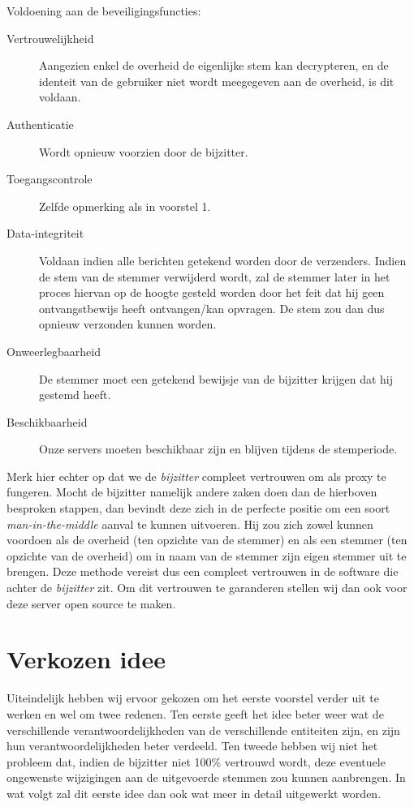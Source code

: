 \documentclass[a4paper,12pt]{article}
\begin{document}
Voldoening aan de beveiligingsfuncties:

\begin{description}
    \item[Vertrouwelijkheid] Aangezien enkel de overheid de eigenlijke stem kan
    decrypteren, en de identeit van de gebruiker niet wordt meegegeven aan de
    overheid, is dit voldaan.
    \item[Authenticatie] Wordt opnieuw voorzien door de bijzitter.
    \item[Toegangscontrole] Zelfde opmerking als in voorstel 1.
    \item[Data-integriteit] Voldaan indien alle berichten getekend worden door
      de verzenders. Indien de stem van de stemmer verwijderd wordt, zal de
      stemmer later in het proces hiervan op de hoogte gesteld worden door het
      feit dat hij geen ontvangstbewijs heeft ontvangen/kan opvragen. De stem
      zou dan dus opnieuw verzonden kunnen worden.
    \item[Onweerlegbaarheid] De stemmer moet een getekend bewijsje van de
        bijzitter krijgen dat hij gestemd heeft.
    \item[Beschikbaarheid] Onze servers moeten beschikbaar zijn en blijven
      tijdens de stemperiode.
\end{description}

Merk hier echter op dat we de \emph{bijzitter} compleet vertrouwen om als proxy
te fungeren. Mocht de bijzitter namelijk andere zaken doen dan de hierboven
besproken stappen, dan bevindt deze zich in de perfecte positie om een soort
\emph{man-in-the-middle} aanval te kunnen uitvoeren. Hij zou zich zowel kunnen
voordoen als de overheid (ten opzichte van de stemmer) en als een stemmer (ten
opzichte van de overheid) om in naam van de stemmer zijn eigen stemmer uit te
brengen. Deze methode vereist dus een compleet vertrouwen in de software die
achter de \emph{bijzitter} zit. Om dit vertrouwen te garanderen stellen wij dan
ook voor deze server open source te maken.

\section{Verkozen idee}

Uiteindelijk hebben wij ervoor gekozen om het eerste voorstel verder uit te
werken en wel om twee redenen. Ten eerste geeft het idee beter weer wat de
verschillende verantwoordelijkheden van de verschillende entiteiten zijn, en
zijn hun verantwoordelijkheden beter verdeeld. Ten tweede hebben wij niet het
probleem dat, indien de bijzitter niet 100\% vertrouwd wordt, deze eventuele
ongewenste wijzigingen aan de uitgevoerde stemmen zou kunnen aanbrengen.  In wat
volgt zal dit eerste idee dan ook wat meer in detail uitgewerkt worden.
\end{document}

